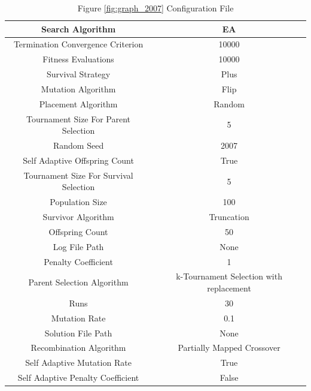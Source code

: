 \documentclass{standalone}
\begin{document}
\begin{table}[!htb]
	\centering
	\caption{Figure \ref{fig:graph_2007} Configuration File}
	\label{tab:graph_2007}
	\begin{tabular}{| c | c |}
		\hline
		Search Algorithm		& EA		 \\
		\hline
		Termination Convergence Criterion		& 10000		 \\
		\hline
		Fitness Evaluations		& 10000		 \\
		\hline
		Survival Strategy		& Plus		 \\
		\hline
		Mutation Algorithm		& Flip		 \\
		\hline
		Placement Algorithm		& Random		 \\
		\hline
		Tournament Size For Parent Selection		& 5		 \\
		\hline
		Random Seed		& 2007		 \\
		\hline
		Self Adaptive Offspring Count		& True		 \\
		\hline
		Tournament Size For Survival Selection		& 5		 \\
		\hline
		Population Size		& 100		 \\
		\hline
		Survivor Algorithm		& Truncation		 \\
		\hline
		Offspring Count		& 50		 \\
		\hline
		Log File Path		& None		 \\
		\hline
		Penalty Coefficient		& 1		 \\
		\hline
		Parent Selection Algorithm		& k-Tournament Selection with replacement		 \\
		\hline
		Runs		& 30		 \\
		\hline
		Mutation Rate		& 0.1		 \\
		\hline
		Solution File Path		& None		 \\
		\hline
		Recombination Algorithm		& Partially Mapped Crossover		 \\
		\hline
		Self Adaptive Mutation Rate		& True		 \\
		\hline
		Self Adaptive Penalty Coefficient		& False		 \\
		\hline
	\end{tabular}
\end{table}
\end{document}
